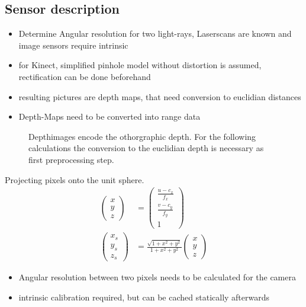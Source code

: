 \documentclass[doktyp=marbeit,fontsize=12pt,sprache=english,draft=true,hausschrift=true,fleqn]{TUBAFarbeiten}
\begin{document}
\subsection{Sensor description}

\begin{itemize}
    \item Determine Angular resolution for two light-rays, Laserscans are known and image sensors require intrinsic
    \item for Kinect, simplified pinhole model without distortion is assumed, rectification can be done beforehand
    \item resulting pictures are depth maps, that need conversion to euclidian distances
    \item Depth-Maps need to be converted into range data
\end{itemize}

\begin{figure}[H]
    
    \caption[Range Data and Depth Maps visualized]{Depthimages encode the othorgraphic depth. For the following calculations the conversion to the euclidian depth is necessary as first preprocessing step.}
\end{figure}

Projecting pixels onto the unit sphere.
\begin{align}
	\begin{pmatrix}x \\ y \\ z \end{pmatrix} &= \begin{pmatrix} \frac{u - c_x}{f_x} \\ \frac{v - c_y}{f_y} \\ 1 \end{pmatrix} \\
	\begin{pmatrix}x_s \\ y_s \\ z_s \end{pmatrix} &= \frac{\sqrt{1 + x^2 + y^2}}{1 + x^2 + y^2} \begin{pmatrix} x \\ y \\ z \end{pmatrix}
\end{align}

\begin{itemize}
    \item Angular resolution between two pixels needs to be calculated for the camera
    \item intrinsic calibration required, but can be cached statically afterwards
\end{itemize}
\end{document}
